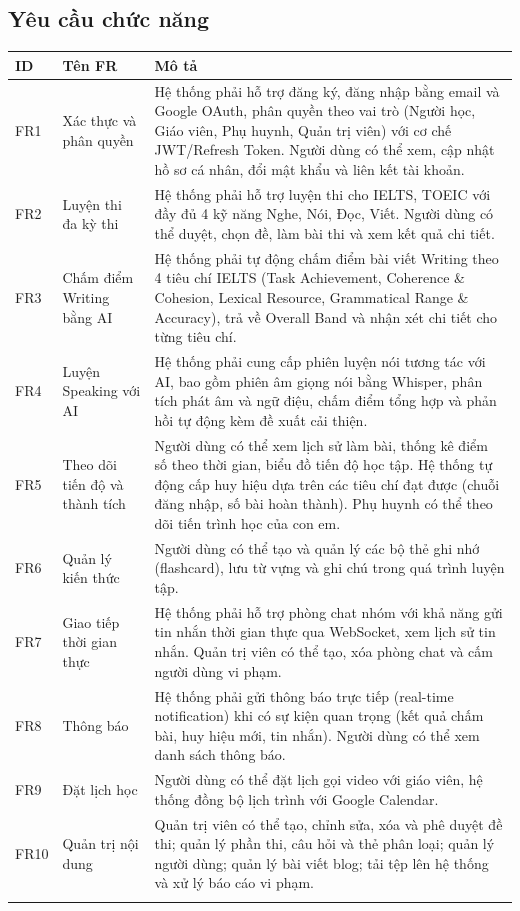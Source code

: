 \subsection{Yêu cầu chức năng}
{
\renewcommand{\arraystretch}{1.5}
\begin{tabularx}{\textwidth}{|l|l|X|}
\hline
\textbf{ID} & \textbf{Tên FR} & \textbf{Mô tả} \\ \hline
FR1 & Xác thực và phân quyền & Hệ thống phải hỗ trợ đăng ký, đăng nhập bằng email và Google OAuth, phân quyền theo vai trò (Người học, Giáo viên, Phụ huynh, Quản trị viên) với cơ chế JWT/Refresh Token. Người dùng có thể xem, cập nhật hồ sơ cá nhân, đổi mật khẩu và liên kết tài khoản. \\ \hline
FR2 & Luyện thi đa kỳ thi & Hệ thống phải hỗ trợ luyện thi cho IELTS, TOEIC với đầy đủ 4 kỹ năng Nghe, Nói, Đọc, Viết. Người dùng có thể duyệt, chọn đề, làm bài thi và xem kết quả chi tiết. \\ \hline
FR3 & Chấm điểm Writing bằng AI & Hệ thống phải tự động chấm điểm bài viết Writing theo 4 tiêu chí IELTS (Task Achievement, Coherence \& Cohesion, Lexical Resource, Grammatical Range \& Accuracy), trả về Overall Band và nhận xét chi tiết cho từng tiêu chí. \\ \hline
FR4 & Luyện Speaking với AI & Hệ thống phải cung cấp phiên luyện nói tương tác với AI, bao gồm phiên âm giọng nói bằng Whisper, phân tích phát âm và ngữ điệu, chấm điểm tổng hợp và phản hồi tự động kèm đề xuất cải thiện. \\ \hline
FR5 & Theo dõi tiến độ và thành tích & Người dùng có thể xem lịch sử làm bài, thống kê điểm số theo thời gian, biểu đồ tiến độ học tập. Hệ thống tự động cấp huy hiệu dựa trên các tiêu chí đạt được (chuỗi đăng nhập, số bài hoàn thành). Phụ huynh có thể theo dõi tiến trình học của con em. \\ \hline
FR6 & Quản lý kiến thức & Người dùng có thể tạo và quản lý các bộ thẻ ghi nhớ (flashcard), lưu từ vựng và ghi chú trong quá trình luyện tập. \\ \hline
FR7 & Giao tiếp thời gian thực & Hệ thống phải hỗ trợ phòng chat nhóm với khả năng gửi tin nhắn thời gian thực qua WebSocket, xem lịch sử tin nhắn. Quản trị viên có thể tạo, xóa phòng chat và cấm người dùng vi phạm. \\ \hline
FR8 & Thông báo & Hệ thống phải gửi thông báo trực tiếp (real-time notification) khi có sự kiện quan trọng (kết quả chấm bài, huy hiệu mới, tin nhắn). Người dùng có thể xem danh sách thông báo. \\ \hline
FR9 & Đặt lịch học & Người dùng có thể đặt lịch gọi video với giáo viên, hệ thống đồng bộ lịch trình với Google Calendar. \\ \hline
FR10 & Quản trị nội dung & Quản trị viên có thể tạo, chỉnh sửa, xóa và phê duyệt đề thi; quản lý phần thi, câu hỏi và thẻ phân loại; quản lý người dùng; quản lý bài viết blog; tải tệp lên hệ thống và xử lý báo cáo vi phạm. \\ \hline
\caption{Bảng yêu cầu chức năng}
\end{tabularx}}



